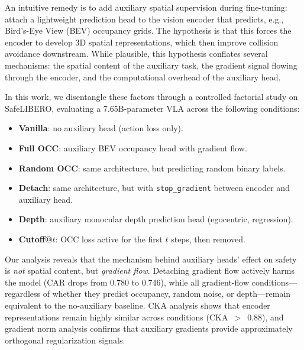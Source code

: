 \documentclass[10pt,letterpaper]{article}
\begin{document}
An intuitive remedy is to add auxiliary spatial supervision during fine-tuning: attach a lightweight prediction head to the vision encoder that predicts, e.g., Bird's-Eye View (BEV) occupancy grids. The hypothesis is that this forces the encoder to develop 3D spatial representations, which then improve collision avoidance downstream. While plausible, this hypothesis conflates several mechanisms: the spatial content of the auxiliary task, the gradient signal flowing through the encoder, and the computational overhead of the auxiliary head.

In this work, we disentangle these factors through a controlled factorial study on SafeLIBERO, evaluating a 7.65B-parameter VLA across the following conditions:
\begin{itemize}[nosep,leftmargin=1.5em]
  \item \textbf{Vanilla}: no auxiliary head (action loss only).
  \item \textbf{Full OCC}: auxiliary BEV occupancy head with gradient flow.
  \item \textbf{Random OCC}: same architecture, but predicting random binary labels.
  \item \textbf{Detach}: same architecture, but with \texttt{stop\_gradient} between encoder and auxiliary head.
  \item \textbf{Depth}: auxiliary monocular depth prediction head (egocentric, regression).
  \item \textbf{Cutoff@$t$}: OCC loss active for the first $t$ steps, then removed.
\end{itemize}

Our analysis reveals that the mechanism behind auxiliary heads' effect on safety is \emph{not} spatial content, but \emph{gradient flow}. Detaching gradient flow actively harms the model (CAR drops from 0.780 to 0.746), while all gradient-flow conditions---regardless of whether they predict occupancy, random noise, or depth---remain equivalent to the no-auxiliary baseline. CKA analysis shows that encoder representations remain highly similar across conditions (CKA~$>$~0.88), and gradient norm analysis confirms that auxiliary gradients provide approximately orthogonal regularization signals.
\end{document}
